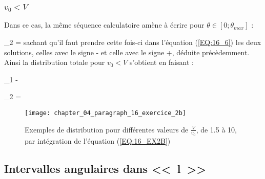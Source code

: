 \subsubsection{$v_{0} < V$}

Dans ce cas, la m\^eme s\'equence calculatoire am\`ene \`a \'ecrire pour $\theta \in [0;\theta_{max}]$ :
\benn
	\begin{Bmatrix}\end{Bmatrix}_{2} = \sin\theta{}\theta
\eenn
sachant qu'il faut prendre cette fois-ci dans l'\'equation (\ref{EQ:16_6}) les deux solutions, celles avec le signe - et celle avec le signe +, d\'eduite pr\'ec\`edemment. Ainsi la distribution totale pour $v_{0} < V$ s'obtient en faisant :
\be
	\begin{Bmatrix}\end{Bmatrix}_{1} - \begin{Bmatrix}\end{Bmatrix}_{2} = \sin\theta{}\theta\label{EQ:16_EX2B}
\ee

\begin{figure}[htb!]
	\begin{center}
		\texttt{[image: chapter\_04\_paragraph\_16\_exercice\_2b]}
		\caption{Exemples de distribution pour diff\'erentes valeurs de $\frac{V}{v_{0}}$, de 1.5 à 10, par int\'egration de l'\'equation (\ref{EQ:16_EX2B})}\label{FIG:4_16_EX2B}
	\end{center}
\end{figure}

\subsection{Intervalles angulaires dans <<~l~>>}

